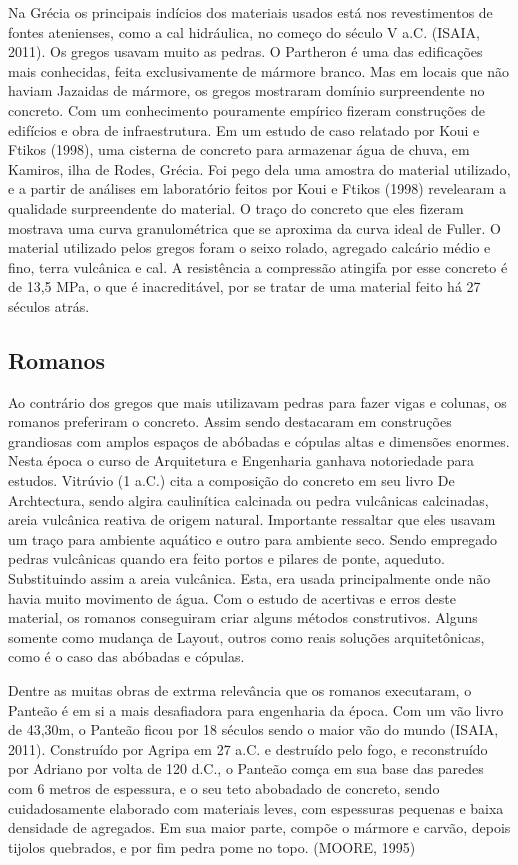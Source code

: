 Na Grécia os principais indícios dos materiais usados está nos revestimentos de fontes atenienses, como a cal hidráulica, no começo do século V a.C. (ISAIA, 2011).
Os gregos usavam muito as pedras. O Partheron é uma das edificações mais conhecidas, feita exclusivamente de mármore branco. Mas em locais que não haviam Jazaidas de mármore, os gregos mostraram domínio surpreendente no concreto. Com um conhecimento pouramente empírico fizeram construções de edifícios e obra de infraestrutura. Em um estudo de caso relatado por Koui e Ftikos (1998), uma cisterna de concreto para armazenar água de chuva, em Kamiros, ilha de Rodes, Grécia. Foi pego dela uma amostra do material utilizado, e a partir de análises em laboratório feitos por Koui e Ftikos (1998) revelearam a qualidade surpreendente do material. O traço do concreto que eles fizeram mostrava uma curva granulométrica que se aproxima da curva ideal de Fuller. O material utilizado pelos gregos foram o seixo rolado, agregado calcário médio e fino, terra vulcânica e cal. A resistência a compressão atingifa por esse concreto é de 13,5 MPa, o que é inacreditável, por se tratar de uma material feito há 27 séculos atrás.

\subsection{Romanos}

Ao contrário dos gregos que mais utilizavam pedras para fazer vigas e colunas, os romanos preferiram o concreto. Assim sendo destacaram em construções grandiosas com amplos espaços de abóbadas e cópulas altas e dimensões enormes. Nesta época o curso de Arquitetura e Engenharia ganhava notoriedade para estudos.
Vitrúvio (1 a.C.) cita a composição do concreto em seu livro De Archtectura, sendo algira caulinítica calcinada ou pedra vulcânicas calcinadas, areia vulcânica reativa de origem natural. Importante ressaltar que eles usavam um traço para ambiente aquático e outro para ambiente seco. Sendo empregado pedras vulcânicas quando era feito portos e pilares de ponte, aqueduto. Substituindo assim a areia vulcânica. Esta, era usada principalmente onde não havia muito movimento de água.
Com o estudo de acertivas e erros deste material, os romanos conseguiram criar alguns métodos construtivos. Alguns somente como mudança de Layout, outros como reais soluções arquitetônicas, como é o caso das abóbadas e cópulas.


Dentre as muitas obras de extrma relevância que os romanos executaram, o Panteão é em si a mais desafiadora para engenharia da época. Com um vão livro de 43,30m, o Panteão ficou por 18 séculos sendo o maior vão do mundo (ISAIA, 2011). Construído por Agripa em 27 a.C. e destruído pelo fogo, e reconstruído por Adriano por volta de 120 d.C., o Panteão comça em sua base das paredes com 6 metros de espessura, e o seu teto abobadado de concreto, sendo cuidadosamente elaborado com materiais leves, com espessuras pequenas e baixa densidade de agregados. Em sua maior parte, compõe o mármore e carvão, depois tijolos quebrados, e por fim pedra pome no topo. (MOORE, 1995)

